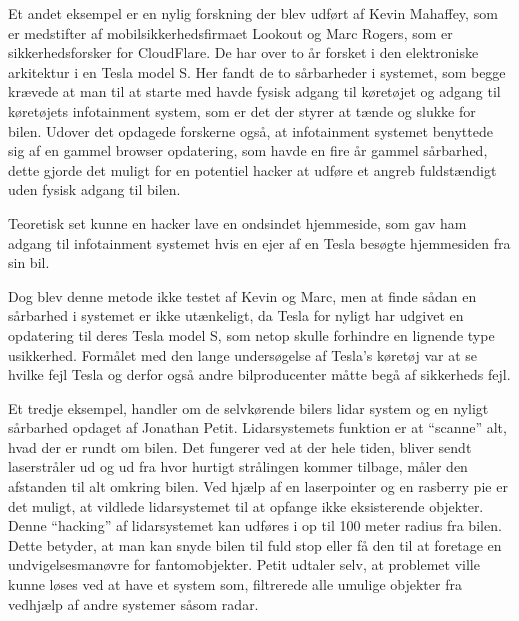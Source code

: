 Et andet eksempel er en nylig forskning der blev udført af Kevin Mahaffey, som er medstifter af mobilsikkerhedsfirmaet Lookout og Marc Rogers, som er sikkerhedsforsker for CloudFlare. De har over to år forsket i den elektroniske arkitektur i en Tesla model S. Her fandt de to sårbarheder i systemet, som begge krævede at man til at starte med havde fysisk adgang til køretøjet og adgang til køretøjets infotainment system, som er det der styrer at tænde og slukke for bilen. Udover det opdagede forskerne også, at infotainment systemet benyttede sig af en gammel browser opdatering, som havde en fire år gammel sårbarhed, dette gjorde det muligt for en potentiel hacker at udføre et angreb fuldstændigt uden fysisk adgang til bilen.

Teoretisk set kunne en hacker lave en ondsindet hjemmeside, som gav ham adgang til infotainment systemet hvis en ejer af en Tesla besøgte hjemmesiden fra sin bil.

Dog blev denne metode ikke testet af Kevin og Marc, men at finde sådan en sårbarhed i systemet er ikke utænkeligt, da Tesla for nyligt har udgivet en opdatering til deres Tesla model S, som netop skulle forhindre en lignende type usikkerhed.  Formålet med den lange undersøgelse af Tesla's køretøj var at se hvilke fejl Tesla og derfor også andre bilproducenter måtte begå af sikkerheds fejl. \cite{Tesla}


Et tredje eksempel, handler om de selvkørende bilers lidar system og en nyligt sårbarhed opdaget af Jonathan Petit. Lidarsystemets funktion er at ``scanne'' alt, hvad der er rundt om bilen. Det fungerer ved at der hele tiden, bliver sendt laserstråler ud og ud fra hvor hurtigt strålingen kommer tilbage, måler den afstanden til alt omkring bilen. Ved hjælp af en laserpointer og en rasberry pie er det muligt, at vildlede lidarsystemet til at opfange ikke eksisterende objekter. Denne ``hacking'' af lidarsystemet kan udføres i op til 100 meter radius fra bilen. Dette betyder, at man kan snyde bilen til fuld stop eller få den til at foretage en  undvigelsesmanøvre for fantomobjekter. Petit udtaler selv, at problemet ville kunne løses ved at have et system som, filtrerede alle umulige objekter fra vedhjælp af andre systemer såsom radar. \cite{Lidar}
